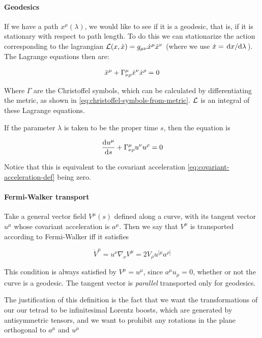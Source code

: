 \documentclass[main.tex]{subfiles}
\begin{document}
\paragraph{Geodesics}

If we have a path $x^\mu(\lambda)$, we would like to see if it is a geodesic, that is, if it is stationary with respect to path length. To do this we can stationarize the action corresponding to the lagrangian $\mathcal{L} (x, \Dot{x}) = g_{\mu\nu} \Dot{x}^\mu \Dot{x}^\nu$ (where we use $\Dot{x} = \dv*{x}{\lambda}$). The Lagrange equations then are:

\begin{equation}
    \Ddot{x}^\mu + \Gamma^\mu_{\nu\rho} \Dot{x}^\nu \Dot{x}^\rho = 0
\end{equation}

Where $\Gamma$ are the Christoffel symbols, which can be calculated by differentiating the metric, as shown in \eqref{eq:christoffel-symbols-from-metric}. $\mathcal{L}$ is an integral of these Lagrange equations.

If the parameter $\lambda$ is taken to be the proper time $s$, then the equation is

\begin{equation}
    \dv{u^\mu}{s} + \Gamma^\mu _{\nu\rho} u^\nu u^\rho = 0
\end{equation}

Notice that this is equivalent to the covariant acceleration \eqref{eq:covariant-acceleration-def} being zero.

\paragraph{Fermi-Walker transport}

Take a general vector field \(V ^{\mu} (s)\) defined along a curve, with its tangent vector \(u^\mu\) whose covariant acceleration is \(a^\mu\).
Then we say that \(V^\mu\) is transported according to Fermi-Walker iff it satisfies

\begin{equation}
    \dot{V}^\mu  = u^\nu \nabla_\nu V^\mu
    = 2 V_\rho u^{[\mu} a^{\rho]}
\end{equation}

This condition is always satisfied by \(V^\mu = u^\mu\), since \(a^\mu u_\mu = 0\), whether or not the curve is a geodesic. The tangent vector is \emph{parallel} transported only for geodesics.

The justification of this definition is the fact that we want the transformations of our our tetrad to be infinitesimal Lorentz boosts, which are generated by antisymmetric tensors, and we want to prohibit any rotations in the plane orthogonal to \(a^\mu\) and \(u^\mu\)
\end{document}
